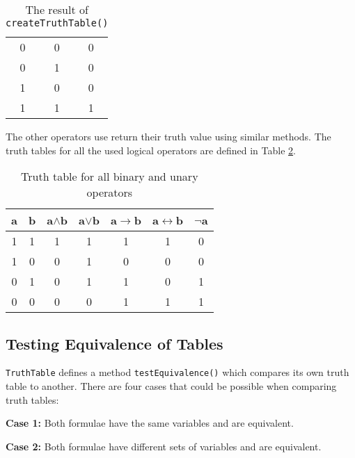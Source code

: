 \documentclass{report}
\begin{document}
\begin{table}[h]
  \begin{center}
    \begin{tabular}{ || c | c || c || }
      \hline
      0 & 0 & 0 \\
      0 & 1 & 0 \\
      1 & 0 & 0 \\
      1 & 1 & 1 \\
      \hline
    \end{tabular}
  \end{center}
  \caption{The result of {\tt createTruthTable()}}
  \label{table:final_generated_table}
\end{table}

The other operators use return their truth value using similar methods. The truth tables for all the used logical operators are defined in Table \ref{table:logical_operators}.

\begin{table}[h]
  \begin{center}
    \begin{tabular}{ || c | c || c | c | c | c | c || }
      \hline
      a & b & a$\land$b & a$\lor$b & a$\to$b & a$\leftrightarrow$b & $\lnot$a \\ \hline
      1 & 1 & 1 & 1 & 1 & 1 & 0 \\
      1 & 0 & 0 & 1 & 0 & 0 & 0 \\
      0 & 1 & 0 & 1 & 1 & 0 & 1 \\
      0 & 0 & 0 & 0 & 1 & 1 & 1 \\
      \hline
    \end{tabular}
  \end{center}
  \caption{Truth table for all binary and unary operators}
  \label{table:logical_operators}
\end{table}

\subsection{Testing Equivalence of Tables}
\label{sub:testing_equivalence_of_tables}

{\tt TruthTable} defines a method {\tt testEquivalence()} which compares its own truth table to another. There are four cases that could be possible when comparing truth tables:

\textbf{Case 1: } Both formulae have the same variables and are equivalent.

\textbf{Case 2: } Both formulae have different sets of variables and are equivalent.
\end{document}
